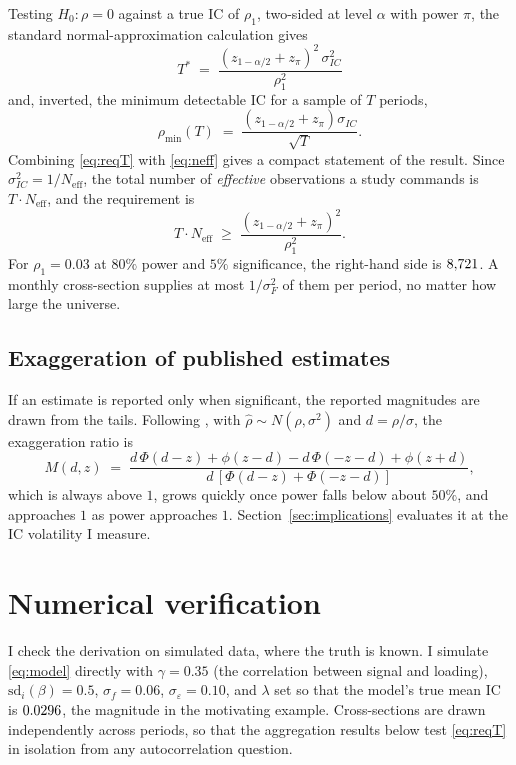 \documentclass[11pt,a4paper]{article}
\newcommand{\Neff}{N_{\mathrm{eff}}}
\newcommand{\sF}{\sigma_F}
\begin{document}
Testing $H_0\!: \rho = 0$ against a true IC of $\rho_1$, two-sided at level $\alpha$ with
power $\pi$, the standard normal-approximation calculation gives
\begin{equation}
\boxed{\;T^{*} \;=\; \frac{\left(z_{1-\alpha/2} + z_{\pi}\right)^{2}\,\sigma_{IC}^{2}}{\rho_1^{2}}\;}
\label{eq:reqT}
\end{equation}
and, inverted, the minimum detectable IC for a sample of $T$ periods,
\begin{equation}
\rho_{\min}(T) \;=\; \frac{\left(z_{1-\alpha/2} + z_{\pi}\right)\sigma_{IC}}{\sqrt{T}}.
\label{eq:mde}
\end{equation}
Combining \eqref{eq:reqT} with \eqref{eq:neff} gives a compact statement of the result. Since $\sigma_{IC}^2 = 1/\Neff$, the total number of \emph{effective}
observations a study commands is $T \cdot \Neff$, and the requirement is
\begin{equation}
T \cdot \Neff \;\geq\; \frac{\left(z_{1-\alpha/2} + z_{\pi}\right)^{2}}{\rho_1^{2}} .
\label{eq:effobs}
\end{equation}
For $\rho_1 = 0.03$ at $80\%$ power and $5\%$ significance, the right-hand side is
$8{,}721$. A monthly cross-section supplies at most $1/\sF^2$ of them per period, no
matter how large the universe.

\subsection{Exaggeration of published estimates}\label{sec:typem}

If an estimate is reported only when significant, the reported magnitudes are drawn from
the tails. Following \citet{gelman2014beyond}, with $\hat\rho \sim N(\rho, \sigma^2)$ and
$d = \rho/\sigma$, the exaggeration ratio is
\begin{equation}
M(d, z) \;=\;
\frac{d\,\Phi(d-z) + \phi(z-d) - d\,\Phi(-z-d) + \phi(z+d)}
     {d\,\left[\Phi(d-z) + \Phi(-z-d)\right]} ,
\label{eq:typem}
\end{equation}
which is always above $1$, grows quickly once power falls below about $50\%$, and
approaches $1$ as power approaches $1$. Section~\ref{sec:implications} evaluates it at the IC volatility I
measure.

\section{Numerical verification}\label{sec:simulation}

I check the derivation on simulated data, where the truth is known. I simulate
\eqref{eq:model} directly with $\gamma = 0.35$ (the correlation between signal and
loading), $\mathrm{sd}_i(\beta) = 0.5$, $\sigma_f = 0.06$, $\sigma_\varepsilon = 0.10$,
and $\lambda$ set so that the model's true mean IC is $0.0296$, the magnitude in the
motivating example. Cross-sections
are drawn independently across periods, so that the aggregation results below test
\eqref{eq:reqT} in isolation from any autocorrelation question.
\end{document}
